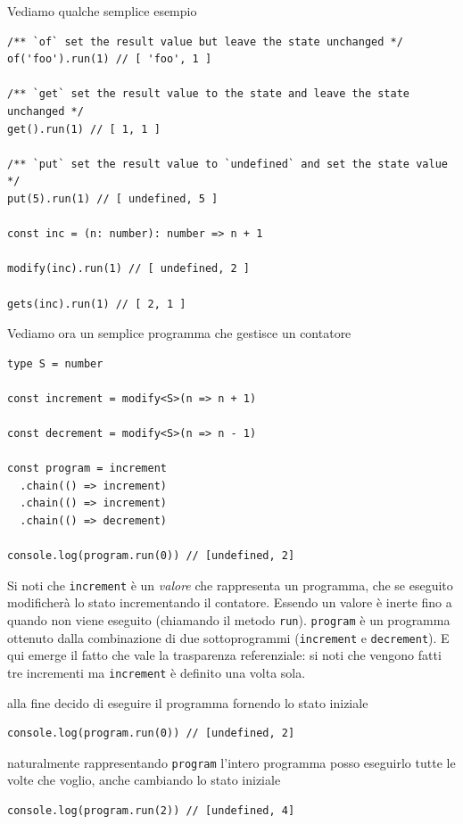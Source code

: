 \documentclass[12pt]{article}
\begin{document}
Vediamo qualche semplice esempio

\begin{verbatim}
/** `of` set the result value but leave the state unchanged */
of('foo').run(1) // [ 'foo', 1 ]

/** `get` set the result value to the state and leave the state unchanged */
get().run(1) // [ 1, 1 ]

/** `put` set the result value to `undefined` and set the state value */
put(5).run(1) // [ undefined, 5 ]

const inc = (n: number): number => n + 1

modify(inc).run(1) // [ undefined, 2 ]

gets(inc).run(1) // [ 2, 1 ]
\end{verbatim}

Vediamo ora un semplice programma che gestisce un contatore

\begin{verbatim}
type S = number

const increment = modify<S>(n => n + 1)

const decrement = modify<S>(n => n - 1)

const program = increment
  .chain(() => increment)
  .chain(() => increment)
  .chain(() => decrement)

console.log(program.run(0)) // [undefined, 2]
\end{verbatim}

Si noti che \texttt{increment} è un \emph{valore} che rappresenta un programma, che se eseguito
modificherà lo stato incrementando il contatore.
Essendo un valore è inerte fino a quando non viene eseguito (chiamando il metodo \texttt{run}).
\texttt{program} è un programma ottenuto dalla combinazione di due sottoprogrammi (\texttt{increment} e \texttt{decrement}).
E qui emerge il fatto che vale la trasparenza referenziale: si noti che vengono fatti tre incrementi
ma \texttt{increment} è definito una volta sola.

alla fine decido di eseguire il programma fornendo lo stato iniziale

\begin{verbatim}
console.log(program.run(0)) // [undefined, 2]
\end{verbatim}

naturalmente rappresentando \texttt{program} l'intero programma posso eseguirlo tutte le volte che voglio,
anche cambiando lo stato iniziale

\begin{verbatim}
console.log(program.run(2)) // [undefined, 4]
\end{verbatim}
\end{document}
